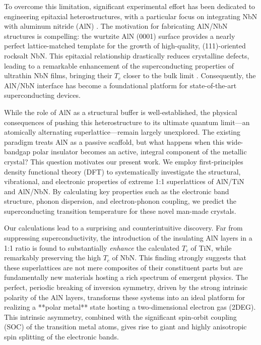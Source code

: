 \documentclass[aps,prl,reprint,superscriptaddress]{revtex4-2}
\begin{document}
To overcome this limitation, significant experimental effort has been dedicated
to engineering epitaxial heterostructures, with a particular focus on
integrating NbN with aluminum nitride (AlN) \cite{lita_high-quality_2017}. The
motivation for fabricating AlN/NbN structures is compelling: the wurtzite AlN
(0001) surface provides a nearly perfect lattice-matched template for the
growth of high-quality, (111)-oriented rocksalt NbN. This epitaxial
relationship drastically reduces crystalline defects, leading to a remarkable
enhancement of the superconducting properties of ultrathin NbN films, bringing
their $T_c$ closer to the bulk limit \cite{pernice_role_2012}. Consequently,
the AlN/NbN interface has become a foundational platform for state-of-the-art
superconducting devices.

While the role of AlN as a structural buffer is well-established, the physical
consequences of pushing this heterostructure to its ultimate quantum limit---an
atomically alternating superlattice---remain largely unexplored. The existing
paradigm treats AlN as a passive scaffold, but what happens when this
wide-bandgap polar insulator becomes an active, integral component of the
metallic crystal? This question motivates our present work. We employ
first-principles density functional theory (DFT) to systematically investigate
the structural, vibrational, and electronic properties of extreme 1:1
superlattices of AlN/TiN and AlN/NbN. By calculating key properties such as the
electronic band structure, phonon dispersion, and electron-phonon coupling, we
predict the superconducting transition temperature for these novel man-made
crystals.

Our calculations lead to a surprising and counterintuitive discovery. Far from
suppressing superconductivity, the introduction of the insulating AlN layers in
a 1:1 ratio is found to substantially \textit{enhance} the calculated $T_c$ of
TiN, while remarkably preserving the high $T_c$ of NbN. This finding strongly
suggests that these superlattices are not mere composites of their constituent
parts but are fundamentally new materials hosting a rich spectrum of emergent
physics. The perfect, periodic breaking of inversion symmetry, driven by the
strong intrinsic polarity of the AlN layers, transforms these systems into an
ideal platform for realizing a **polar metal** state hosting a two-dimensional
electron gas (2DEG). This intrinsic asymmetry, combined with the significant
spin-orbit coupling (SOC) of the transition metal atoms, gives rise to giant
and highly anisotropic spin splitting of the electronic bands.
\end{document}
